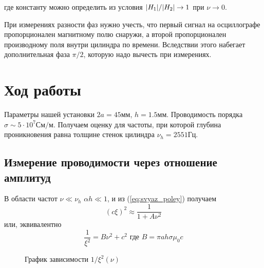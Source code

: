 \documentclass[a4paper]{article}
\begin{document}
где константу можно определить из условия $\abs{H_1}/\abs{H_2} \rightarrow 1$ при
$\nu \rightarrow 0$.

\vspace{0.3cm}

При измерениях разности фаз нужно учесть, что первый сигнал на осциллографе
пропорционален магнитному полю снаружи, а второй пропорционален производному
поля внутри цилиндра по времени. Вследствии этого набегает дополнительная фаза $\pi/2$,
которую надо вычесть при измерениях.



\newpage
\section{Ход работы}

Параметры нашей установки $2a = 45мм$, $h=1.5мм$. Проводимость порядка
$\sigma \sim 5\cdot 10^7 См/м$. Получаем оценку для частоты, при которой
глубина проникновения равна толщине стенок цилиндра $\nu_h = 2551 Гц$.

\subsection{Измерение проводимости через отношение амплитуд}
В области частот $\nu \ll \nu_h$ $\alpha h \ll 1$, и из (\ref{eq:svyaz_poley}) получаем
\begin{equation*}
    {(c\xi)}^2 \approx \frac{1}{1+A\nu^2}
\end{equation*}
или, эквивалентно
\begin{equation*}
    \frac{1}{\xi^2}=B\nu^2 + c^2 \text{ где } B=\pi a h \sigma \mu_0 c
    \label{eq:liniya_dlya_c}
\end{equation*}

\begin{figure}[h]
    \caption{График зависимости $1/\xi^2(\nu)$}\label{fig:xi_nu_low_freq_linearized}
    \newpage
\end{figure}
\end{document}
